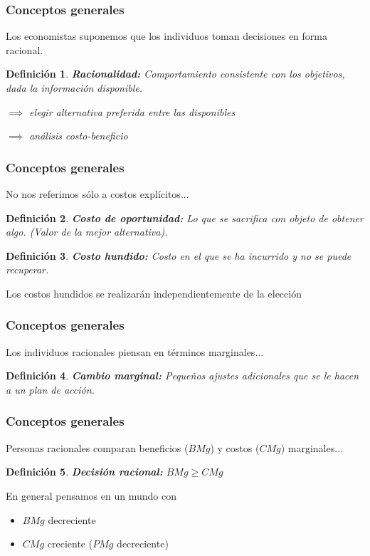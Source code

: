\documentclass[dvipsnames,table]{beamer}
\newtheorem{mydef}{Definición}
\begin{document}
		\begin{frame}
			\frametitle{Conceptos generales}
			Los economistas suponemos que los individuos toman decisiones en forma racional.
			\begin{mydef}
				\textbf{Racionalidad:} Comportamiento consistente con los objetivos, dada la información disponible.
				
				\vspace{.2cm}
				$\implies$ elegir alternativa preferida entre las disponibles
				
				\vspace{.2cm}
				$\implies$ análisis costo-beneficio
			\end{mydef}
		\end{frame}

		\begin{frame}
			\frametitle{Conceptos generales}
			No nos referimos sólo a costos explícitos...
			\begin{mydef}
				\textbf{Costo de oportunidad:} Lo que se sacrifica con objeto de obtener algo. (Valor de la mejor alternativa).
			\end{mydef}
			\begin{mydef}
				\textbf{Costo hundido:} Costo en el que se ha incurrido y no se puede recuperar.
			\end{mydef}
			\vspace{.3cm}
			Los costos hundidos se realizarán independientemente de la elección
		\end{frame}

		\begin{frame}
			\frametitle{Conceptos generales}
			Los individuos racionales piensan en términos marginales...
			\begin{mydef}
				\textbf{Cambio marginal:} Pequeños ajustes adicionales que se le hacen a un plan de acción.
			\end{mydef}
		\end{frame}

		\begin{frame}
			\frametitle{Conceptos generales}
			Personas racionales comparan beneficios ($BMg$) y costos ($CMg$) marginales...
			\begin{mydef}
				\textbf{Decisión racional:} $BMg\geq CMg$
			\end{mydef}
			\vspace{.3cm}
			En general pensamos en un mundo con
			\begin{itemize}
				\item $BMg$ decreciente
				\item $CMg$ creciente ($PMg$ decreciente)
			\end{itemize}
		\end{frame}
\end{document}
